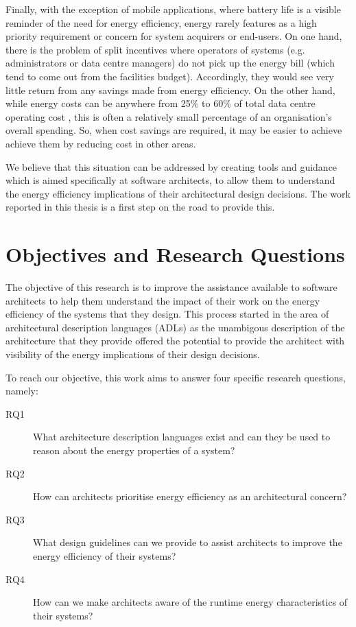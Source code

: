 Finally, with the exception of mobile applications, where battery life is a visible reminder of the need for energy efficiency, energy rarely features as a high priority requirement or concern for system acquirers or end-users. On one hand, there is the problem of split incentives where operators of systems (e.g. administrators or data centre managers) do not pick up the energy bill (which tend to come out from the facilities budget). Accordingly, they would see very little return from any savings made from energy efficiency. On the other hand, while energy costs can be anywhere from 25\% to 60\% of total data centre operating cost \cite{techuk2013-dcpower}, this is often a relatively small percentage of an organisation's overall spending. So, when cost savings are required, it may be easier to achieve achieve them by reducing cost in other areas.

We believe that this situation can be addressed by creating tools and guidance which is aimed specifically at software architects, to allow them to understand the energy efficiency implications of their architectural design decisions.  The work reported in this thesis is a first step on the road to provide this.

\section{Objectives and Research Questions}

The objective of this research is to improve the assistance available to software architects to help them understand the impact of their work on the energy efficiency of the systems that they design.  This process started in the area of architectural description languages (ADLs) as the unambigous description of the architecture that they provide offered the potential to provide the architect with visibility of the energy implications of their design decisions.

To reach our objective, this work aims to answer four specific research questions, namely:

\begin{description}
\item [RQ1] What architecture description languages exist and can they be used to reason about the energy properties of a system?
\item [RQ2] How can architects prioritise energy efficiency as an architectural concern?
\item [RQ3] What design guidelines can we provide to assist architects to improve the energy efficiency of their systems?
\item [RQ4] How can we make architects aware of the runtime energy characteristics of their systems?
\end{description}

